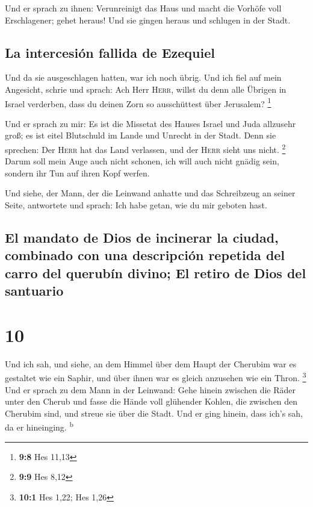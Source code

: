  Und er sprach zu ihnen: Verunreinigt das Haus und macht
die Vorhöfe voll Erschlagener; gehet heraus! Und sie gingen heraus und
schlugen in der Stadt.

\hypertarget{la-intercesiuxf3n-fallida-de-ezequiel}{%
\subsection{La intercesión fallida de
Ezequiel}\label{la-intercesiuxf3n-fallida-de-ezequiel}}

 Und da sie ausgeschlagen hatten, war ich noch übrig. Und
ich fiel auf mein Angesicht, schrie und sprach: Ach Herr \textsc{Herr},
willst du denn alle Übrigen in Israel verderben, dass du deinen Zorn so
ausschüttest über Jerusalem? \footnote{\textbf{9:8} Hes 11,13}

 Und er sprach zu mir: Es ist die Missetat des Hauses
Israel und Juda allzusehr groß; es ist eitel Blutschuld im Lande und
Unrecht in der Stadt. Denn sie sprechen: Der \textsc{Herr} hat das Land
verlassen, und der \textsc{Herr} sieht uns nicht. \footnote{\textbf{9:9}
  Hes 8,12}  Darum soll mein Auge auch nicht schonen, ich
will auch nicht gnädig sein, sondern ihr Tun auf ihren Kopf werfen.

 Und siehe, der Mann, der die Leinwand anhatte und das
Schreibzeug an seiner Seite, antwortete und sprach: Ich habe getan, wie
du mir geboten hast.

\hypertarget{el-mandato-de-dios-de-incinerar-la-ciudad-combinado-con-una-descripciuxf3n-repetida-del-carro-del-querubuxedn-divino-el-retiro-de-dios-del-santuario}{%
\subsection{El mandato de Dios de incinerar la ciudad, combinado con una
descripción repetida del carro del querubín divino; El retiro de Dios
del
santuario}\label{el-mandato-de-dios-de-incinerar-la-ciudad-combinado-con-una-descripciuxf3n-repetida-del-carro-del-querubuxedn-divino-el-retiro-de-dios-del-santuario}}

\hypertarget{section-9}{%
\section{10}\label{section-9}}

 Und ich sah, und siehe, an dem Himmel über dem Haupt der
Cherubim war es gestaltet wie ein Saphir, und über ihnen war es gleich
anzusehen wie ein Thron. \footnote{\textbf{10:1} Hes 1,22; Hes 1,26}
 Und er sprach zu dem Mann in der Leinwand: Gehe hinein
zwischen die Räder unter den Cherub und fasse die Hände voll glühender
Kohlen, die zwischen den Cherubim sind, und streue sie über die Stadt.
Und er ging hinein, dass ich's sah, da er hineinging.
\textsuperscript{b}

